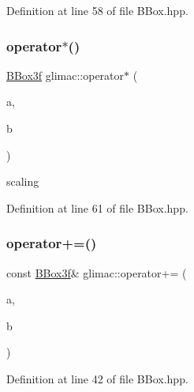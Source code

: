 Definition at line 58 of file B\+Box.\+hpp.

\mbox{\label{namespaceglimac_af5dfeb56647cba37ceb488d57120c9a2}} 
\subsubsection{\texorpdfstring{operator$\ast$()}{operator*()}}
{\footnotesize\ttfamily \hyperlink{structglimac_1_1_b_box3f}{B\+Box3f} glimac\+::operator$\ast$ (\begin{DoxyParamCaption}\item[{const float \&}]{a,  }\item[{const \hyperlink{structglimac_1_1_b_box3f}{B\+Box3f} \&}]{b }\end{DoxyParamCaption})\hspace{0.3cm}{\ttfamily [inline]}}

scaling 

Definition at line 61 of file B\+Box.\+hpp.

\mbox{\label{namespaceglimac_aee1b6179ee300f7f193cd70bd3f66c7f}} 
\subsubsection{\texorpdfstring{operator+=()}{operator+=()}\hspace{0.1cm}{\footnotesize\ttfamily [1/2]}}
{\footnotesize\ttfamily const \hyperlink{structglimac_1_1_b_box3f}{B\+Box3f}\& glimac\+::operator+= (\begin{DoxyParamCaption}\item[{\hyperlink{structglimac_1_1_b_box3f}{B\+Box3f} \&}]{a,  }\item[{const \hyperlink{structglimac_1_1_b_box3f}{B\+Box3f} \&}]{b }\end{DoxyParamCaption})\hspace{0.3cm}{\ttfamily [inline]}}



Definition at line 42 of file B\+Box.\+hpp.

\mbox{\label{namespaceglimac_afdead8416fbbfd3ee6e2acf81206ace2}} 

